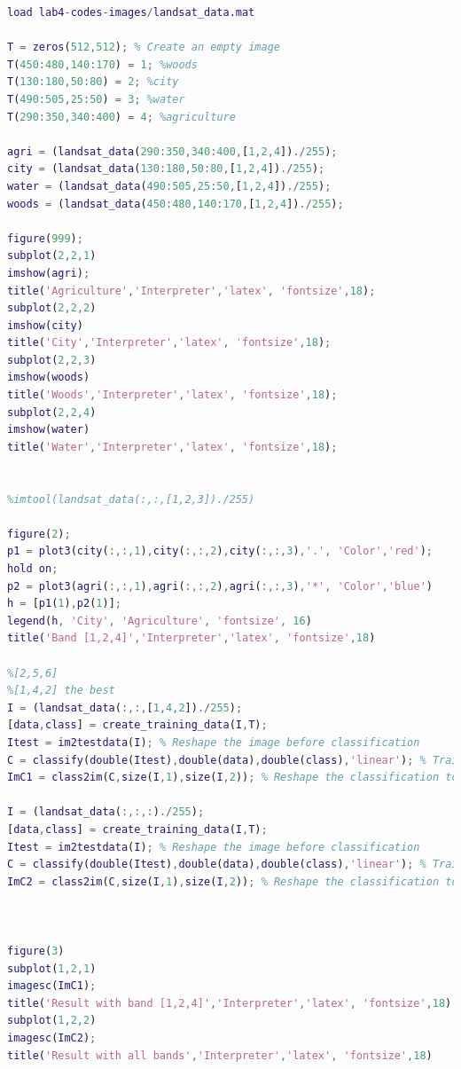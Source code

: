 \documentclass[oneside,a4paper]{article}
\begin{document}
\begin{lstlisting}[language=MATLAB]
load lab4-codes-images/landsat_data.mat

T = zeros(512,512); % Create an empty image
T(450:480,140:170) = 1; %woods
T(130:180,50:80) = 2; %city
T(490:505,25:50) = 3; %water
T(290:350,340:400) = 4; %agriculture

agri = (landsat_data(290:350,340:400,[1,2,4])./255);
city = (landsat_data(130:180,50:80,[1,2,4])./255);
water = (landsat_data(490:505,25:50,[1,2,4])./255);
woods = (landsat_data(450:480,140:170,[1,2,4])./255);

figure(999);
subplot(2,2,1)
imshow(agri);
title('Agriculture','Interpreter','latex', 'fontsize',18);
subplot(2,2,2)
imshow(city)
title('City','Interpreter','latex', 'fontsize',18);
subplot(2,2,3)
imshow(woods)
title('Woods','Interpreter','latex', 'fontsize',18);
subplot(2,2,4)
imshow(water)
title('Water','Interpreter','latex', 'fontsize',18);


%imtool(landsat_data(:,:,[1,2,3])./255)

figure(2);
p1 = plot3(city(:,:,1),city(:,:,2),city(:,:,3),'.', 'Color','red');
hold on;
p2 = plot3(agri(:,:,1),agri(:,:,2),agri(:,:,3),'*', 'Color','blue')
h = [p1(1),p2(1)];
legend(h, 'City', 'Agriculture', 'fontsize', 16)
title('Band [1,2,4]','Interpreter','latex', 'fontsize',18)

%[2,5,6]
%[1,4,2] the best
I = (landsat_data(:,:,[1,4,2])./255); 
[data,class] = create_training_data(I,T);
Itest = im2testdata(I); % Reshape the image before classification
C = classify(double(Itest),double(data),double(class),'linear'); % Train classifier and classify the data
ImC1 = class2im(C,size(I,1),size(I,2)); % Reshape the classification to an image

I = (landsat_data(:,:,:)./255); 
[data,class] = create_training_data(I,T);
Itest = im2testdata(I); % Reshape the image before classification
C = classify(double(Itest),double(data),double(class),'linear'); % Train classifier and classify the data
ImC2 = class2im(C,size(I,1),size(I,2)); % Reshape the classification to an image



figure(3)
subplot(1,2,1)
imagesc(ImC1);
title('Result with band [1,2,4]','Interpreter','latex', 'fontsize',18)
subplot(1,2,2)
imagesc(ImC2);
title('Result with all bands','Interpreter','latex', 'fontsize',18)

\end{lstlisting}

\newpage 
\end{document}
